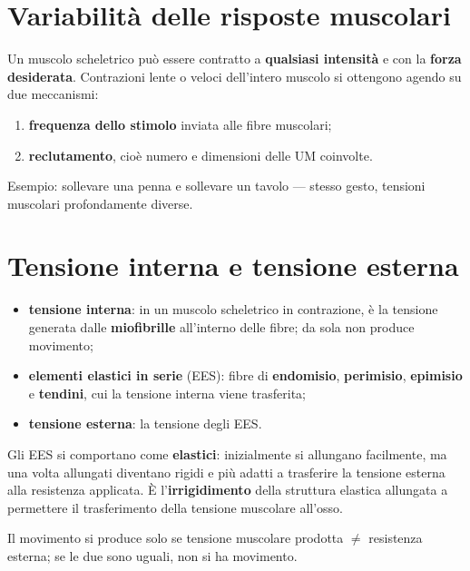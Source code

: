 \section{Variabilità delle risposte muscolari}

Un muscolo scheletrico può essere contratto a \textbf{qualsiasi intensità} e con la \textbf{forza
desiderata}. Contrazioni lente o veloci dell'intero muscolo si ottengono agendo su due
meccanismi:
\begin{enumerate}
  \item \textbf{frequenza dello stimolo} inviata alle fibre muscolari;
  \item \textbf{reclutamento}, cioè numero e dimensioni delle UM coinvolte.
\end{enumerate}

Esempio: sollevare una penna e sollevare un tavolo --- stesso gesto, tensioni muscolari
profondamente diverse.

\section{Tensione interna e tensione esterna}

\begin{itemize}
  \item \textbf{tensione interna}: in un muscolo scheletrico in contrazione, è la tensione
    generata dalle \textbf{miofibrille} all'interno delle fibre; da sola non produce movimento;
  \item \textbf{elementi elastici in serie} (EES): fibre di \textbf{endomisio},
    \textbf{perimisio}, \textbf{epimisio} e \textbf{tendini}, cui la tensione interna viene
    trasferita;
  \item \textbf{tensione esterna}: la tensione degli EES.
\end{itemize}

Gli EES si comportano come \textbf{elastici}: inizialmente si allungano facilmente, ma una volta
allungati diventano rigidi e più adatti a trasferire la tensione esterna alla resistenza
applicata. È l'\textbf{irrigidimento} della struttura elastica allungata a permettere il
trasferimento della tensione muscolare all'osso.

Il movimento si produce solo se tensione muscolare prodotta $\neq$ resistenza esterna; se le due
sono uguali, non si ha movimento.

